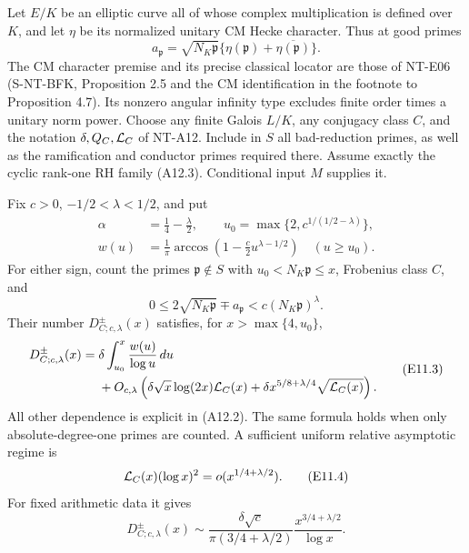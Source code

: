 Let \(E/K\) be an elliptic curve all of whose complex
multiplication is defined over \(K\), and let \(\eta\) be its
normalized unitary CM Hecke character. Thus at good primes
\[
 a_{\mathfrak p}
     =\sqrt{N_K\mathfrak p}
          \{\eta(\mathfrak p)+\overline{\eta(\mathfrak p)}\}.
                                                               \tag{E11.1}
\]
The CM character premise and its precise classical locator
are those of NT-E06 (S-NT-BFK, Proposition 2.5 and the CM
identification in the footnote to Proposition 4.7).
Its nonzero angular infinity type excludes finite order
times a unitary norm power.
Choose any finite Galois \(L/K\), any conjugacy class \(C\),
and the notation \(\delta,Q_C,{\cal L}_C\) of NT-A12.
Include in \(S\) all bad-reduction primes, as well as the
ramification and conductor primes required there.
Assume exactly the cyclic rank-one RH family (A12.3).
Conditional input \(M\) supplies it.

Fix \(c>0\), \(-1/2<\lambda<1/2\), and put
\[
 \begin{aligned}
 \alpha&=\frac14-\frac{\lambda}{2},\qquad
 u_0=\max\{2,c^{1/(1/2-\lambda)}\},\\
 w(u)&=\frac1\pi
       \arccos\left(1-\frac c2 u^{\lambda-1/2}\right)
                  \quad(u\ge u_0).
 \end{aligned}                                             \tag{E11.2}
\]
For either sign, count the primes \(\mathfrak p\notin S\)
with \(u_0<N_K\mathfrak p\le x\), Frobenius class \(C\), and
\[
       0\le 2\sqrt{N_K\mathfrak p}\mp a_{\mathfrak p}
                      <c(N_K\mathfrak p)^\lambda .
\]
Their number \(D_{C;c,\lambda}^{\pm}(x)\) satisfies, for
\(x>\max\{4,u_0\}\),
\[
 \begin{split}
 D_{C;c,\lambda}^{\pm}(x)
   ={}&\delta\int_{u_0}^x\frac{w(u)}{\log u}\,du\\
     &+O_{c,\lambda}\left(
        \delta\sqrt x\log(2x){\cal L}_C(x)
        +\delta x^{5/8+\lambda/4}\sqrt{{\cal L}_C(x)}
                        \right).                         
 \end{split} \tag{E11.3}
\]
All other dependence is explicit in (A12.2). The same formula
holds when only absolute-degree-one primes are counted.
A sufficient uniform relative asymptotic regime is
\[
       {\cal L}_C(x)(\log x)^2=o(x^{1/4+\lambda/2}).
                                                               \tag{E11.4}
\]
For fixed arithmetic data it gives
\[
 D_{C;c,\lambda}^{\pm}(x)
    \sim \frac{\delta\sqrt c}{\pi(3/4+\lambda/2)}
                    \frac{x^{3/4+\lambda/2}}{\log x}.
                                                               \tag{E11.5}
\]

